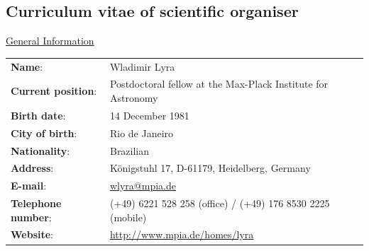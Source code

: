 \documentclass{article}
\newcommand{\hl}[1]{{\large{\sc \underline {#1}}}}
\begin{document}
\clearpage
\newpage

\subsection*{Curriculum vitae of scientific organiser}

\vspace{1cm}

\hl{General Information}

\vspace{2mm}

\begin{tabular}{ll}
  \textbf{Name}: & Wladimir Lyra \\
  \textbf{Current position}: & Postdoctoral fellow at the Max-Plack Institute for Astronomy\\
  \textbf{Birth date}: & 14 December 1981 \\
  \textbf{City of birth}: & Rio de Janeiro \\
  \textbf{Nationality}: & Brazilian \\
  \textbf{Address}: & K\"onigstuhl 17, D-61179, Heidelberg, Germany \\
  \textbf{E-mail}: & \url{wlyra@mpia.de} \\
  \textbf{Telephone number}: &
   (+49) 6221 528 258 (office) / (+49) 176 8530 2225 (mobile) \\
  \textbf{Website}: & \url{http://www.mpia.de/homes/lyra}
\end{tabular}

\vspace{5mm}

\hspace{-.55cm}\hl{Education}
\end{document}

